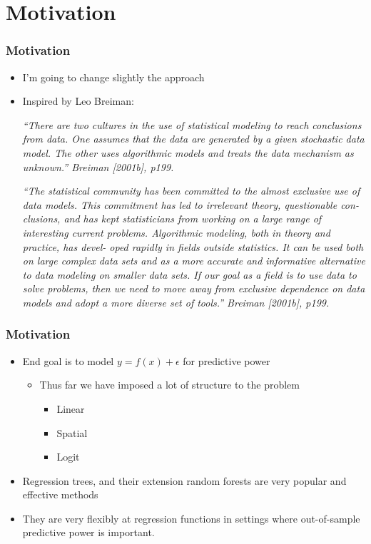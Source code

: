 \documentclass[
  shownotes,
  xcolor={svgnames},
  hyperref={colorlinks,citecolor=DarkBlue,linkcolor=DarkRed,urlcolor=DarkBlue}
  ]{beamer}
\begin{document}
\section{Motivation}
\begin{frame}[fragile]
\frametitle{Motivation}

\begin{itemize}
\item I'm going to change slightly the approach
\medskip
\item Inspired by Leo Breiman:

\medskip
{\scriptsize
{\it ``There are two cultures in the use of statistical modeling to reach conclusions from data. One assumes that the data are generated by a given stochastic data model. The other uses algorithmic models and treats the data mechanism as unknown.'' Breiman [2001b], p199.}
\medskip

{\it ``The statistical community has been committed to the almost exclusive use of data models. This commitment has led to irrelevant theory, questionable con- clusions, and has kept statisticians from working on a large range of interesting current problems. Algorithmic modeling, both in theory and practice, has devel- oped rapidly in fields outside statistics. It can be used both on large complex data sets and as a more accurate and informative alternative to data modeling on smaller data sets. If our goal as a field is to use data to solve problems, then we need to move away from exclusive dependence on data models and adopt a more diverse set of tools.'' Breiman [2001b], p199.}
}
\end{itemize}


\end{frame}

\begin{frame}[fragile]
\frametitle{Motivation}


\begin{itemize}
  \item End goal is to model $y=f(x)+\epsilon$ for predictive power
  \begin{itemize}
    \item Thus far we have imposed a lot of structure to the problem
    \begin{itemize}
      \item Linear
      \item Spatial
      \item Logit
    \end{itemize}

\medskip
  \end{itemize}
  \item Regression trees, and their extension random forests are very popular and effective methods 
  \item They are very flexibly at regression functions in settings where out-of-sample predictive power is important.
\end{itemize}


\end{frame}
\end{document}
